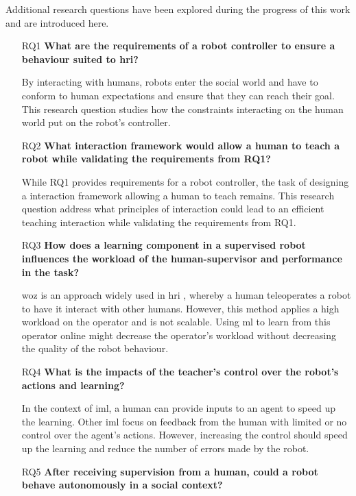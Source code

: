 Additional research questions have been explored during the progress of this
work and are introduced here.

\begin{itemize}
	\item [RQ1] \textbf{What are the requirements of a robot controller to ensure a behaviour suited to \gls{hri}?} 
	
		By interacting with humans, robots enter the social world and have to conform to human expectations and ensure that they can reach their goal. This research question studies how the constraints interacting on the human world put on the robot's controller. %
		
    \item [RQ2] \textbf{What interaction framework would allow a human to teach a robot while validating  the requirements from RQ1?}
    
    	While RQ1 provides requirements for a robot controller, the task of designing a interaction framework allowing a human to teach remains. This research question address what principles of interaction could lead to an efficient teaching interaction while validating the requirements from RQ1. 
    	
    \item [RQ3] \textbf{How does a learning component in a supervised robot influences the workload of the human-supervisor and performance in the task?}
    
        \gls{woz} is an approach widely used in \gls{hri} \citep{riek2012wizard}, whereby a human teleoperates a robot to have it interact with other humans. However, this method applies a high workload on the operator and is not scalable. Using \gls{ml} to learn from this operator online might decrease the operator's workload without decreasing the quality of the robot behaviour.
    
    \item [RQ4] \textbf{What is the impacts of the teacher's control over the robot's actions and learning?} 
    
	    In the context of \gls{iml}, a human can provide inputs to an agent to speed up the learning. Other \gls{iml} \citep{thomaz2008teachable,knox2009interactively} focus on feedback from the human with limited or no control over the agent's actions. However, increasing the control should speed up the learning and reduce the number of errors made by the robot.

    \item [RQ5] \textbf{After receiving supervision from a human, could a robot behave autonomously in a social context?}

	 
\end{itemize}

